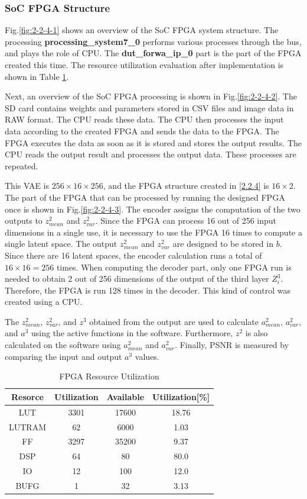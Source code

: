 \documentclass[conference]{IEEEtran}
\begin{document}
\subsubsection{SoC FPGA Structure}\label{2.2.5}
Fig.\ref{fig:2-2-4-1} shows an overview of the SoC FPGA system structure.
The processing \textbf{processing\_system7\_0} performs various processes through the bus, and plays the role of CPU.
The \textbf{dut\_forwa\_ip\_0} part is the part of the FPGA created this time.
The resource utilization evaluation after implementation is shown in Table \ref{tb:3}.

Next, an overview of the SoC FPGA processing is shown in Fig.\ref{fig:2-2-4-2}.
The SD card contains weights and parameters stored in CSV files and image data in RAW format.
The CPU reads these data.
The CPU then processes the input data according to the created FPGA and sends the data to the FPGA.
The FPGA executes the data as soon as it is stored and stores the output results.
The CPU reads the output result and processes the output data.
These processes are repeated.

This VAE is $256\times16\times256$, and the FPGA structure created in \ref{2.2.4} is $16\times2$.
The part of the FPGA that can be processed by running the designed FPGA once is shown in Fig.\ref{fig:2-2-4-3}.
The encoder assigns the computation of the two outputs to $z^2_{mean}$ and $z^2_{var}$.
Since the FPGA can process 16 out of 256 input dimensions in a single use, it is necessary to use the FPGA 16 times to compute a single latent space.
The output $z^2_{mean}$ and $z^2_{var}$ are designed to be stored in $b$.
Since there are 16 latent spaces, the encoder calculation runs a total of $16\times16=256$ times.
When computing the decoder part, only one FPGA run is needed to obtain 2 out of 256 dimensions of the output of the third layer $Z^3_i$.
Therefore, the FPGA is run 128 times in the decoder.
This kind of control was created using a CPU.

The $z^2_{mean}$, $z^2_{var}$, and $z^3$ obtained from the output are used to calculate $a^2_{mean}$, $a^2_{var}$, and $a^3$ using the active functions in the software.
Furthermore, $z^2$ is also calculated on the software using $a^2_{mean}$ and $a^2_{var}$.
Finally, PSNR is measured by comparing the input and output $a^3$ values.
\begin{table}[tb]
  \centering
  \caption{FPGA Resource Utilization}
  \small
  \begin{tabular}{|c|c|c|c|} \hline
    Resorce & Utilization & Available & Utilization[\%]\\ \hline
    LUT & 3301 & 17600 & 18.76 \\ \hline
    LUTRAM & 62 & 6000 & 1.03 \\ \hline
    FF & 3297 & 35200 & 9.37 \\ \hline
    DSP & 64 & 80 & 80.0 \\ \hline
    IO & 12 & 100 & 12.0 \\ \hline
    BUFG & 1 & 32 & 3.13 \\ \hline
  \end{tabular}
  \label{tb:3}
\end{table}
\end{document}
